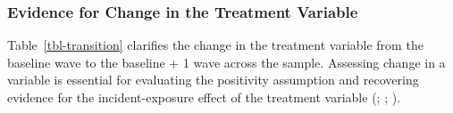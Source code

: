 \documentclass[
  single column]{article}
\begin{document}
\newpage{}

\subsubsection{Evidence for Change in the Treatment
Variable}\label{evidence-for-change-in-the-treatment-variable}

Table~\ref{tbl-transition} clarifies the change in the treatment
variable from the baseline wave to the baseline + 1 wave across the
sample. Assessing change in a variable is essential for evaluating the
positivity assumption and recovering evidence for the incident-exposure
effect of the treatment variable (; ; ).
\end{document}
